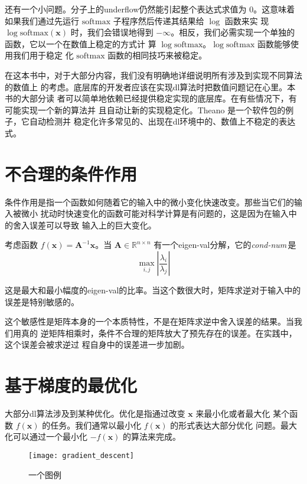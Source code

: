还有一个小问题。分子上的\gls*{underflow}仍然能引起整个表达式求值为 $0$。这意味着
如果我们通过先运行 $\mathrm{softmax}$ 子程序然后传递其结果给 $\log$ 函数来实
现 $\log\mathrm{softmax(\pmb{x})}$ 时，我们会错误地得到
$-\infty$。相反，我们必需实现一个单独的函数，它以一个在数值上稳定的方式计
算 $\log\mathrm{softmax}$。$\log\mathrm{softmax}$ 函数能够使用我们用于稳定
化 $\mathrm{softmax}$ 函数的相同技巧来被稳定。

在这本书中，对于大部分内容，我们没有明确地详细说明所有涉及到实现不同算法的数值上
的考虑。底层库的开发者应该在实现\gls*{dl}算法时把数值问题记在心里。本书的大部分读
者可以简单地依赖已经提供稳定实现的底层库。在有些情况下，有可能实现一个新的算法并
且自动让新的实现稳定化。Theano
\citep{bergstra+al:2010-scipy-small,Bastien-2012}是一个软件包的例子，它自动检测并
稳定化许多常见的、出现在\gls*{dl}环境中的、数值上不稳定的表达式。

\section{不合理的条件作用}
\label{sec:poor_conditioning}

条件作用是指一个函数如何随着它的输入中的微小变化快速改变。那些当它们的输入被微小
扰动时快速变化的函数可能对科学计算是有问题的，这是因为在输入中的舍入误差可以导致
输入上的巨大变化。

考虑函数 $f(\pmb{x}) = \pmb{A}^{-1}\pmb{x}$。当 $\pmb{A} \in \mathbb{R}^{n
  \times n}$ 有一个\gls*{eigen-val}分解，它的\emph{\gls{cond-num}}\,是
\begin{equation}
  \max_{i,j}|\frac{\lambda_i}{\lambda_j}|
\end{equation}

这是最大和最小幅度的\gls*{eigen-val}的比率。当这个数很大时，矩阵求逆对于输入中的
误差是特别敏感的。

这个敏感性是矩阵本身的一个本质特性，不是在矩阵求逆中舍入误差的结果。当我们用真的
逆矩阵相乘时，条件不合理的矩阵放大了预先存在的误差。在实践中，这个误差会被求逆过
程自身中的误差进一步加剧。

\section{基于梯度的最优化}
\label{sec:gradient-based_optimization}

大部分\gls*{dl}算法涉及到某种优化。优化是指通过改变 $\pmb{x}$ 来最小化或者最大化
某个函数 $f(\pmb{x})$ 的任务。我们通常以最小化 $f(\pmb{x})$ 的形式表达大部分优化
问题。最大化可以通过一个最小化 $-f(\pmb{x})$ 的算法来完成。

\begin{figure}[h]
  \centering
  \texttt{[image: gradient\_descent]}
  \caption{一个图例\label{fig:gradient_descent}}
\end{figure}
